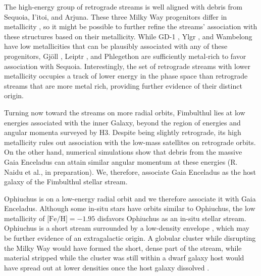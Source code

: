 \documentclass[twocolumn]{aastex63}
\newcommand{\feh}{\ensuremath{\textrm{[Fe/H]}}}
\begin{document}
The high-energy group of retrograde streams is well aligned with debris from Sequoia, I'itoi, and Arjuna.
These three Milky Way progenitors differ in metallicity \citep{naidu2020}, so it might be possible to further refine the streams' association with these structures based on their metallicity.
While GD-1 \citep[spectroscopic $\feh=-2.3$,][]{bonaca2020b}, Ylgr \citep[spectroscopic $\feh=-1.9$,][]{ibata2019}, and  Wambelong \citep[isochrone $\feh=-2.2$,][]{shipp2018} have low metallicities that can be plausibly associated with any of these progenitors, Gj\" oll \citep[spectroscopic $\feh=-1.5$,][]{hansen2020}, Leiptr \citep[isochrone $\feh=-1.6$,][]{ibata2019}, and Phlegethon \citep[spectroscopic $\feh=-1.6$,][]{ibata2018} are sufficiently metal-rich to favor association with Sequoia.
Interestingly, the set of retrograde streams with lower metallicity occupies a track of lower energy in the phase space than retrograde streams that are more metal rich, providing further evidence of their distinct origin.

Turning now toward the streams on more radial orbits, Fimbulthul lies at low energies associated with the inner Galaxy, beyond the region of energies and angular momenta surveyed by H3.
Despite being slightly retrograde, its high metallicity rules out association with the low-mass satellites on retrograde orbits.
On the other hand, numerical simulations show that debris from the massive Gaia Enceladus can attain similar angular momentum at these energies (R. Naidu et al., in preparation).
We, therefore, associate Gaia Enceladus as the host galaxy of the Fimbulthul stellar stream.


Ophiuchus is on a low-energy radial orbit and we therefore associate it with Gaia Enceladus.
Although some in-situ stars have orbits similar to Ophiuchus, the low metallicity of $\feh=-1.95$ \citep{sesar2015} disfavors Ophiuchus as an in-situ stellar stream.
Ophiuchus is a short stream surrounded by a low-density envelope \citep{bernard2014, sesar2015}, which may be further evidence of an extragalactic origin.
A globular cluster while disrupting the Milky Way would have formed the short, dense part of the stream, while material stripped while the cluster was still within a dwarf galaxy host would have spread out at lower densities once the host galaxy dissolved \citep{carlberg2018, malhan2020}.
\end{document}
